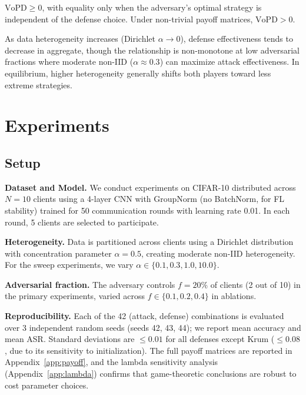 \documentclass{article}
\begin{document}
\begin{theorem}
$\text{VoPD} \geq 0$, with equality only when the adversary's optimal strategy is independent of the defense choice. Under non-trivial payoff matrices, $\text{VoPD} > 0$.
\end{theorem}

\begin{proposition}
As data heterogeneity increases (Dirichlet $\alpha \to 0$), defense effectiveness tends to decrease in aggregate, though the relationship is non-monotone at low adversarial fractions where moderate non-IID ($\alpha \approx 0.3$) can maximize attack effectiveness. In equilibrium, higher heterogeneity generally shifts both players toward less extreme strategies.
\end{proposition}

\section{Experiments}
\label{sec:experiments}

\subsection{Setup}

\textbf{Dataset and Model.} We conduct experiments on CIFAR-10 distributed across $N=10$ clients using a 4-layer CNN with GroupNorm (no BatchNorm, for FL stability) trained for 50 communication rounds with learning rate 0.01. In each round, 5 clients are selected to participate.

\textbf{Heterogeneity.} Data is partitioned across clients using a Dirichlet distribution with concentration parameter $\alpha = 0.5$, creating moderate non-IID heterogeneity. For the sweep experiments, we vary $\alpha \in \{0.1, 0.3, 1.0, 10.0\}$.

\textbf{Adversarial fraction.} The adversary controls $f = 20\%$ of clients (2 out of 10) in the primary experiments, varied across $f \in \{0.1, 0.2, 0.4\}$ in ablations.

\textbf{Reproducibility.} Each of the 42 (attack, defense) combinations is evaluated over 3 independent random seeds (seeds 42, 43, 44); we report mean accuracy and mean ASR. Standard deviations are ${\leq}0.01$ for all defenses except Krum (${\leq}0.08$, due to its sensitivity to initialization). The full payoff matrices are reported in Appendix~\ref{app:payoff}, and the lambda sensitivity analysis (Appendix~\ref{app:lambda}) confirms that game-theoretic conclusions are robust to cost parameter choices.
\end{document}
